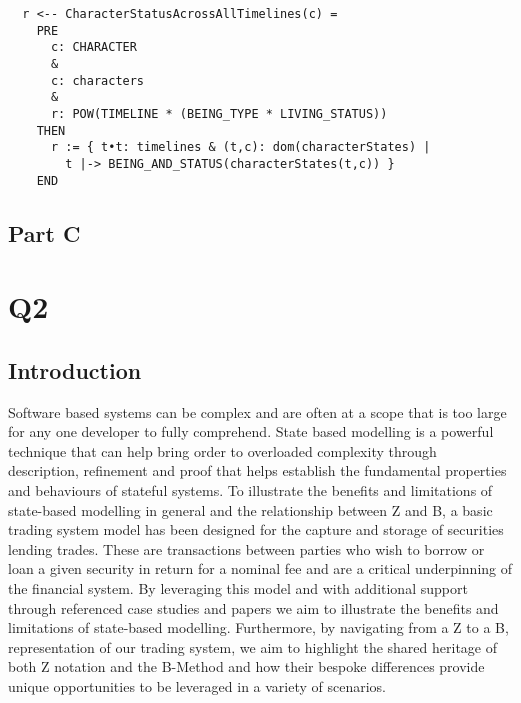 \documentclass{article}
\begin{document}
\pagebreak
\begin{verbatim}
  r <-- CharacterStatusAcrossAllTimelines(c) =
    PRE
      c: CHARACTER
      &
      c: characters
      &
      r: POW(TIMELINE * (BEING_TYPE * LIVING_STATUS))
    THEN
      r := { t•t: timelines & (t,c): dom(characterStates) | 
        t |-> BEING_AND_STATUS(characterStates(t,c)) }
    END
\end{verbatim}

\pagebreak

\subsection*{Part C}

\pagebreak

\section*{Q2}

\subsection*{Introduction}

Software based systems can be complex and are often at a scope that is too large for any one developer to fully comprehend. State based modelling is a powerful technique that can help bring order to overloaded complexity through description, refinement and proof that helps establish the fundamental properties and behaviours of stateful systems.
\newline \newline
To illustrate the benefits and limitations of state-based modelling in general and the relationship between Z and B, a basic trading system model has been designed for the capture and storage of securities lending trades. These are transactions between parties who wish to borrow or loan a given security in return for a nominal fee and are a critical underpinning of the financial system.
\newline \newline
By leveraging this model and with additional support through referenced case studies and papers we aim to illustrate the benefits and limitations of state-based modelling. Furthermore, by navigating from a Z to a B, representation of our trading system, we aim to highlight the shared heritage of both Z notation and the B-Method and how their bespoke differences provide unique opportunities to be leveraged in a variety of scenarios.
\end{document}
